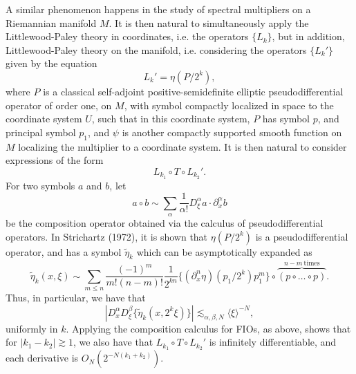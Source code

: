 A similar phenomenon happens in the study of spectral multipliers on a Riemannian manifold $M$.  It is then natural to simultaneously apply the Littlewood-Paley theory in coordinates, i.e. the operators $\{ L_k \}$, but in addition, Littlewood-Paley theory on the manifold, i.e. considering the operators $\{ L_k' \}$ given by the equation
%
\[ L_k' = \eta( P / 2^k ), \]
%
where $P$ is a classical self-adjoint positive-semidefinite elliptic pseudodifferential operator of order one, on $M$, with symbol compactly localized in space to the coordinate system $U$, such that in this coordinate system, $P$ has symbol $p$, and principal symbol $p_1$, and $\psi$ is another compactly supported smooth function on $M$ localizing the multiplier to a coordinate system. It is then natural to consider expressions of the form
%
\[ L_{k_1} \circ T \circ L_{k_2}'. \]
%
For two symbols $a$ and $b$, let
%
\[ a \circ b \sim \sum_\alpha \frac{1}{\alpha!} D_\xi^\alpha a \cdot \partial_x^\alpha b \]
%
be the composition operator obtained via the calculus of pseudodifferential operators. In Strichartz (1972), it is shown that $\eta( P / 2^k )$ is a pseudodifferential operator, and has a symbol $\tilde{\eta}_k$ which can be asymptotically expanded as
%
\[ \tilde{\eta}_k(x,\xi) \sim \sum_{m \leq n} \frac{(-1)^{m}}{m! (n-m)!} \frac{1}{2^{kn}} \{ (\partial_x^n \eta)( p_1 / 2^k ) p_1^m \} \circ \overbrace{(p \circ \dots \circ p)}^{n - m\ \text{times}}. \]
%
Thus, in particular, we have that
%
\[ |D^\alpha_x D^\beta_\xi \{ \tilde{\eta}_k(x, 2^k \xi) \}| \lesssim_{\alpha,\beta,N} \langle\xi \rangle^{-N}, \]
%
uniformly in $k$. Applying the composition calculus for FIOs, as above, shows that for $|k_1 - k_2| \gtrsim 1$, we also have that $L_{k_1} \circ T \circ L_{k_2}'$ is infinitely differentiable, and each derivative is $O_N( 2^{-N(k_1 + k_2)} )$.




